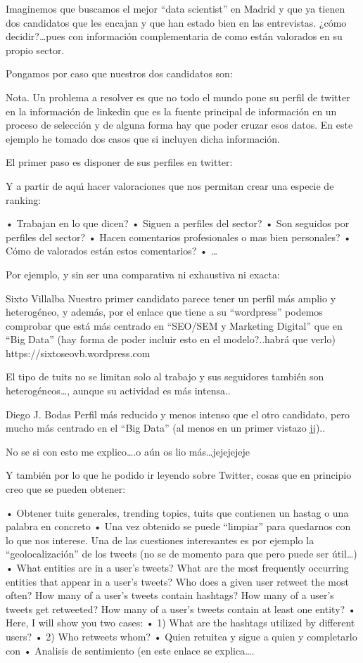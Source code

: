 \documentclass[11pt,a4paper,leqno,titlepage,twoside]{book}
\begin{document}
Imaginemos que buscamos el mejor “data scientist” en Madrid y que ya tienen dos candidatos que les encajan y que han estado bien 
en las entrevistas. ¿c\'omo decidir?…pues con informaci\'on complementaria de como est\'an valorados en su propio sector.

Pongamos por caso que nuestros dos candidatos son:

 

Nota. Un problema a resolver es que no todo el mundo pone su perfil de twitter en la informaci\'on de linkedin que es la fuente 
principal de informaci\'on en un proceso de selecci\'on y de alguna forma hay que poder cruzar esos datos. En este ejemplo he 
tomado dos casos que si incluyen dicha informaci\'on.

El primer paso es disponer de sus perfiles en twitter:

 		 

Y a partir de aqu\'{\i} hacer valoraciones que nos permitan crear una especie de ranking:

•	Trabajan en lo que dicen?
•	Siguen a perfiles del sector?
•	Son seguidos por perfiles del sector?
•	Hacen comentarios profesionales o mas bien personales?
•	C\'omo de valorados est\'an estos comentarios?
•	…






Por ejemplo, y sin ser una comparativa ni exhaustiva ni exacta:

Sixto Villalba
Nuestro primer candidato parece tener un perfil m\'as amplio y heterog\'eneo, y adem\'as, por el enlace que tiene a su 
“wordpress” podemos comprobar que est\'a m\'as centrado en “SEO/SEM y Marketing Digital” que en “Big Data” (hay forma de 
poder incluir esto en el modelo?..habr\'a que verlo)
https://sixtoseovb.wordpress.com

El tipo de tuits no se limitan solo al trabajo y sus seguidores tambi\'en son heterog\'eneos…, aunque su actividad es m\'as intensa..


Diego J. Bodas
Perfil m\'as reducido y menos intenso que el otro candidato, pero mucho m\'as centrado en el “Big Data” (al menos en un primer vistazo jj)..

No se si con esto me explico….o a\'un os lio m\'as…jejejejeje

Y tambi\'en por lo que he podido ir leyendo sobre Twitter, cosas que en principio creo que se pueden obtener:

•	Obtener tuits generales, trending topics, tuits que contienen un hastag o una palabra en concreto
•	Una vez obtenido se puede “limpiar” para quedarnos con lo que nos interese. Una de las cuestiones interesantes es por ejemplo la “geolocalizaci\'on” de los tweets (no se de momento para que pero puede ser \'util…)
•	What entities are in a user's tweets?
What are the most frequently occurring entities that appear in a user's tweets?
Who does a given user retweet the most often?
How many of a user's tweets contain hashtags?
How many of a user's tweets get retweeted?
How many of a user's tweets contain at least one entity?
•	Here, I will show you two cases:
•	1) What are the hashtags utilized by different users?
•	2) Who retweets whom?
•	Quien retuitea y sigue a quien y completarlo con
•	Analisis de sentimiento
(en este enlace se explica….
\end{document}
